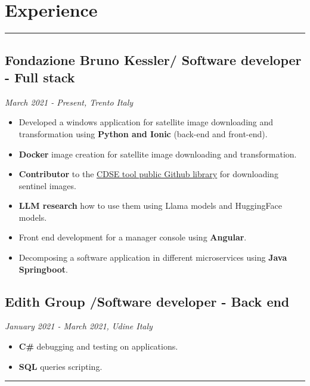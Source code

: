 \documentclass[a4paper,10pt]{article}
\begin{document}
\begin{minipage}[t]{0.25\textwidth}
    \section*{Experience}
    \vspace{8.1cm} %
    \rule{0.6cm}{0.3mm}
\end{minipage}
\hfill
\begin{minipage}[t]{0.75\textwidth}
     \subsection*{Fondazione Bruno Kessler/ Software developer - Full stack}
    \textit{ March 2021 - Present, Trento Italy  } \\
    \begin{itemize}[leftmargin=1cm]
        \item Developed a windows application for satellite image downloading and transformation using \textbf{Python and Ionic} (back-end and front-end).
        \item \textbf{Docker} image creation for satellite image downloading and transformation.
        \item \textbf{Contributor} to the  \textcolor{blue}{\uline{\href{https://github.com/CDSETool/CDSETool}{CDSE tool public Github library}}} for downloading sentinel images.
        \item \textbf{LLM research} how to use them using Llama models and HuggingFace models.
        \item Front end development for a manager console using \textbf{Angular}.
        \item Decomposing a software application in different microservices using \textbf{Java Springboot}.
    \end{itemize}
    \vspace{0.2cm} %
    \subsection*{Edith Group /Software developer - Back end}
    \textit{January 2021 - March 2021, Udine Italy} \\
    \begin{itemize}[leftmargin=1cm]
        \item \textbf{C\#} debugging and testing on applications.
        \item \textbf{SQL} queries scripting.
    \end{itemize}
    \rule{\linewidth}{0.5mm}
\end{minipage}
\end{document}
